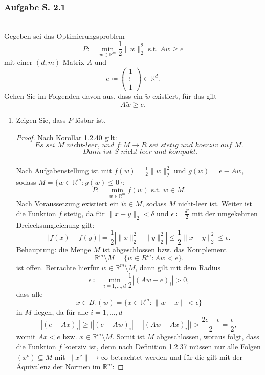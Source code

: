 \documentclass[12pt]{extreport} %
\newcommand{\R}{\mathbb{R}}
\theoremstyle{named}
\theoremstyle{nnamed}
\theoremstyle{itshape}
\theoremstyle{normal}
\begin{document}
\subsubsection{Aufgabe S. 2.1} ~\\

Gegeben sei das Optimierungsproblem
$$ P: \quad \min_{w \in \R^m} \frac{1}{2} \| w \|_2^2 \text{ s.t. } Aw \geq e $$
mit einer $(d, m)$-Matrix $A$ und
$$ e \coloneqq \left(\begin{array}{c} 1 \\ \vdots \\ 1 \end{array}\right) \in \R^d. $$
Gehen Sie im Folgenden davon aus, dass ein $\tilde{w}$ existiert, für das gilt
$$ A \tilde{w} \geq e. $$
\begin{enumerate}
	\item Zeigen Sie, dass $P$ lösbar ist.
		\begin{proof}
			Nach Korollar 1.2.40 gilt:
				$$ \textit{Es sei } M \textit{ nicht-leer, und } f \colon M \rightarrow R \textit{ sei stetig und koerziv auf } M. $$
				$$ \textit{ Dann ist } S \textit{ nicht-leer und kompakt.} $$ ~\\
			Nach Aufgabenstellung ist mit $f(w) = \frac{1}{2} \| w \|_2^2$ und $g(w) = e - Aw$, sodass $M = \{ w \in \R^m \colon  g(w) \leq 0 \}$:
				$$ P: \quad \min_{w \in \R^m} f(w) \text{ s.t. } w \in M. $$
			Nach Voraussetzung existiert ein $\tilde{w} \in M$, sodass $M$ nicht-leer ist. Weiter ist die Funktion $f$ stetig, da für $\| x - y \|_2 < \delta$ und $\epsilon \coloneqq \frac{\delta^2}{2}$ mit der umgekehrten Dreiecksungleichung gilt:	
			$$ \left| f(x) - f(y) \right| = \frac{1}{2} \left| \| x \|^2_2 - \| y \|_2^2 \right| \leq \frac{1}{2} \| x - y \|_2^2 \leq \epsilon. $$
			Behauptung: die Menge $M$ ist abgeschlossen bzw. das Komplement
			$$ \R^m \setminus M = \{ w \in R^m \colon A w < e \}. $$
			ist offen. Betrachte hierfür $w \in \R^m \setminus M$, dann gilt mit dem Radius
			$$ \epsilon \coloneqq \min_{i = 1, \dotsc, d} \frac{1}{2} \left| (Aw - e)_i \right| > 0, $$ 
			dass alle 
			$$ x \in B_{\epsilon}(w) = \{ x \in \R^m \colon \| w - x \| < \epsilon \} $$
			in $M$ liegen, da für alle $i = 1, \dotsc, d$
			$$ \left| (e - Ax)_i \right| \geq \big| \left| (e - Aw)_i \right| - \left| (Aw - Ax)_i \right| \big| > \frac{2 \epsilon - \epsilon}{2} = \frac{\epsilon}{2}, $$
			womit $Ax < e$ bzw. $x \in \R^m \setminus M$. Somit ist $M$ abgeschlossen, woraus folgt, dass die Funktion $f$ koerziv ist, denn nach Definition 1.2.37 müssen nur alle Folgen $(x^\nu) \subseteq M$ mit $\| x^\nu \| \rightarrow \infty$ betrachtet werden und für die gilt mit der Äquivalenz der Normen im $\R^m$:

\end{proof}
\end{enumerate}
\end{document}
